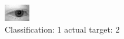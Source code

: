 \begin{figure}[h!]
\begin{center}
\includegraphics[width=0.60\columnwidth]{figures/ID507_class_1_target_2.png}
\end{center}
\caption{ Classification: 1 actual target: 2}
\label{fig:ID507_class_1_target_2}
\end{figure}
